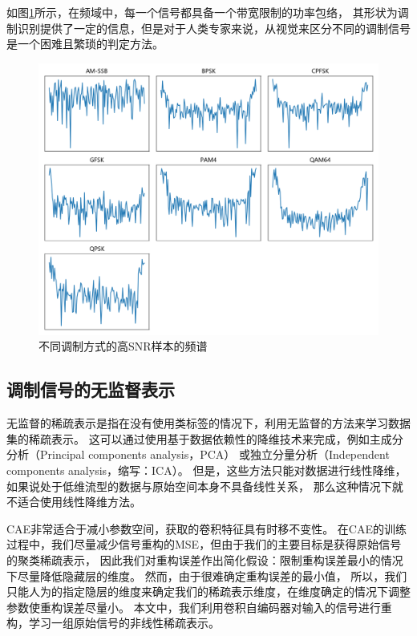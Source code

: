 如图\ref{sec:fig_3_3}所示，在频域中，每一个信号都具备一个带宽限制的功率包络，
其形状为调制识别提供了一定的信息，但是对于人类专家来说，从视觉来区分不同的调制信号是一个困难且繁琐的判定方法。\par
\begin{figure}[!h]
	\centering
	\includegraphics[scale=0.45]{figures/chapter_3/fig_3_3}
	\caption{不同调制方式的高SNR样本的频谱}\label{sec:fig_3_3}
\end{figure}

\subsection{调制信号的无监督表示}

无监督的稀疏表示是指在没有使用类标签的情况下，利用无监督的方法来学习数据集的稀疏表示。
这可以通过使用基于数据依赖性的降维技术来完成，例如主成分分析（Principal components analysis，PCA）
或独立分量分析（Independent components analysis，缩写：ICA）。
但是，这些方法只能对数据进行线性降维，如果说处于低维流型的数据与原始空间本身不具备线性关系，
那么这种情况下就不适合使用线性降维方法。\par

CAE非常适合于减小参数空间，获取的卷积特征具有时移不变性。
在CAE的训练过程中，我们尽量减少信号重构的MSE，但由于我们的主要目标是获得原始信号的聚类稀疏表示，
因此我们对重构误差作出简化假设：限制重构误差最小的情况下尽量降低隐藏层的维度。
然而，由于很难确定重构误差的最小值，
所以，我们只能人为的指定隐层的维度来确定我们的稀疏表示维度，在维度确定的情况下调整参数使重构误差尽量小。
本文中，我们利用卷积自编码器对输入的信号进行重构，学习一组原始信号的非线性稀疏表示。\par

